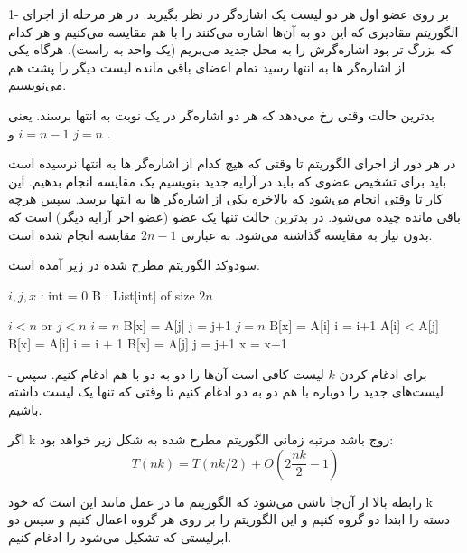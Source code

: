 1-
بر روی عضو اول هر دو لیست یک اشاره‌گر در نظر بگیرید. در هر مرحله از اجرای الگوریتم مقادیری که این دو به آن‌‌ها اشاره می‌کنند را با هم مقایسه می‌کنیم و هر کدام که بزرگ تر بود اشاره‌گرش را به محل جدید می‌بریم (یک واحد به راست).
هرگاه یکی از اشاره‌گر ها به انتها رسید تمام اعضای باقی مانده لیست دیگر را پشت هم می‌نویسیم.

بدترین حالت وقتی رخ می‌دهد که هر دو اشاره‌گر در یک نوبت به انتها برسند.
یعنی 
$i = n-1$
و 
$j = n$
.

در هر دور از اجرای الگوریتم تا وقتی که هیچ کدام از اشاره‌گر ها به انتها نرسیده است باید برای تشخیص عضوی که باید در آرایه جدید بنویسیم یک مقایسه انجام بدهیم. این کار تا وقتی انجام می‌شود که بالاخره یکی از اشاره‌گر ها به انتها برسد. سپس هرچه باقی مانده چیده می‌شود.
در بدترین حالت تنها یک عضو (عضو اخر آرایه دیگر) است که بدون نیاز به مقایسه گذاشته می‌شود. به عبارتی
$2n-1$
مقایسه انجام شده است.

سودوکد الگوریتم مطرح شده در زیر آمده است.

\begin{latin}
\begin{codebox}
	\li $i,j,x$ : int = 0
	\li B : List[int] of size $2n$
	
	\li \While $i<n$ or $j<n$ \Then
	\li \If $i = n$ \Then
		\li B[x] = A[j]
		\li j = j+1
	\li \Else \If $j = n$
		\li B[x] = A[i]
		\li i = i+1
	\li \Else \If A[i] < A[j]
		\li B[x] = A[i]
		\li i = i + 1
	\li \Else
		\li B[x] = A[j]
		\li j = j+1
	\End
	\li x = x+1
	\End
	
\end{codebox}
\end{latin}
-
برای ادغام کردن $k$ لیست کافی است آن‌ها را دو به دو با هم ادغام کنیم. سپس لیست‌های جدید را دوباره با هم دو به دو ادغام کنیم تا وقتی که تنها یک لیست داشته باشیم. 

اگر k زوج باشد مرتبه زمانی الگوریتم مطرح شده به شکل زیر خواهد بود:
\begin{equation*}
	T(nk) = T(nk/2) + O(2 \frac{nk}{2}-1)
\end{equation*}


رابطه بالا از آن‌جا ناشی می‌شود که الگوریتم ما در عمل مانند این است که خود k دسته را ابتدا دو گروه کنیم و این الگوریتم را بر روی هر گروه اعمال کنیم و سپس دو ابرلیستی که تشکیل می‌شود را ادغام کنیم.

